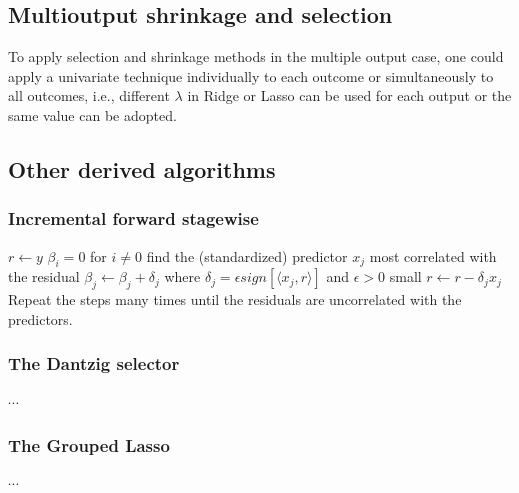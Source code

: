 \subsection{Multioutput shrinkage and selection}
To apply selection and shrinkage methods in the multiple output case, one could apply a univariate technique individually to each outcome or simultaneously to all outcomes, i.e., different $\lambda$ in Ridge or Lasso can be used for each output or the same value can be adopted.

\subsection{Other derived algorithms}
\subsubsection{Incremental forward stagewise}
\begin{algorithm}
$r\leftarrow y$ \;
$\beta_i =0$ for $i\ne 0$\;
find the (standardized) predictor $x_j$ most correlated with the residual \;
$\beta_j \leftarrow \beta_j + \delta_j$ where $\delta_j = \epsilon sign\left[\langle x_j, r \rangle\right]$ and $\epsilon >0$ small\;
$r\leftarrow r-\delta_j x_j$\;
Repeat the steps many times until the residuals are uncorrelated with the predictors.
\end{algorithm}

\subsubsection{The Dantzig selector}
$\cdots$

\subsubsection{The Grouped Lasso}
$\cdots$
